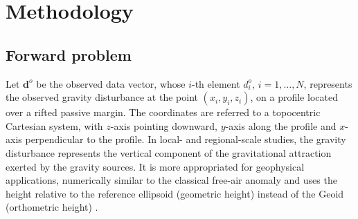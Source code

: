 \documentclass[manuscript,revised]{geophysics}
\begin{document}
\section{Methodology}


\subsection{Forward problem}


Let $\mathbf{d}^{o}$ be the observed data vector, whose $i$-th element $d^{o}_{i}$, 
$i = 1, \dots, N$, represents the observed gravity disturbance \citep{heiskanen-moritz1967} 
at the point $(x_{i}, y_{i}, z_{i})$, on a profile located over a rifted passive margin. 
The coordinates are referred to a topocentric Cartesian system, with $z$-axis pointing
downward, $y$-axis along the profile and $x$-axis perpendicular to the profile. 
In local- and regional-scale studies, the gravity disturbance 
represents the vertical component of the gravitational attraction exerted by the gravity 
sources. It is more appropriated for geophysical applications,
numerically similar to the classical free-air anomaly and uses the height relative to the
reference ellipsoid (geometric height) instead of the Geoid (orthometric height)
\citep{li2001, fairhead2003, hackney-featherstone2003, hinze2005, vajda-etal2006, 
vajda-etal2007}.
\end{document}
